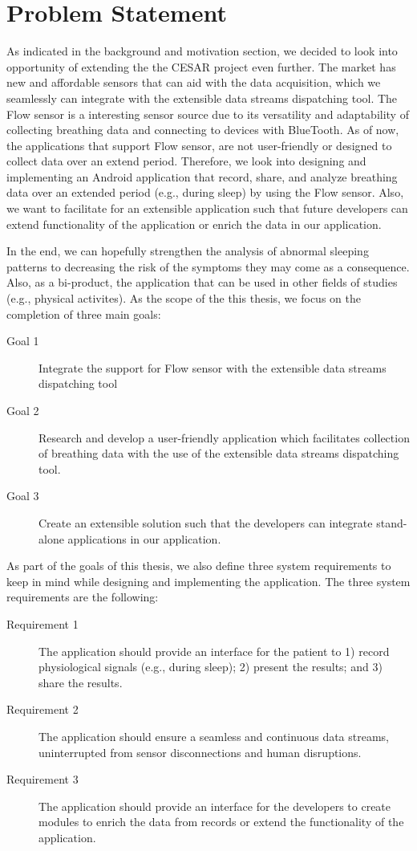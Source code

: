 \section{Problem Statement}

As indicated in the background and motivation section, we decided to look into opportunity of extending the the CESAR project even further. The market has new and affordable sensors that can aid with the data acquisition, which we seamlessly can integrate with the extensible data streams dispatching tool. The Flow sensor is a interesting sensor source due to its versatility and adaptability of collecting breathing data and connecting to devices with BlueTooth. As of now, the applications that support Flow sensor, are not user-friendly or designed to collect data over an extend period. Therefore, we look into designing and implementing an Android application that record, share, and analyze breathing data over an extended period (e.g., during sleep) by using the Flow sensor. Also, we want to facilitate for an extensible application such that future developers can extend functionality of the application or enrich the data in our application. 

In the end, we can hopefully strengthen the analysis of abnormal sleeping patterns to decreasing the risk of the symptoms they may come as a consequence. Also, as a bi-product, the application that can be used in other fields of studies (e.g., physical activites). As the scope of the this thesis, we focus on the completion of three main goals:

\begin{description}
    \item[Goal 1] Integrate the support for Flow sensor with the extensible data streams dispatching tool
    \item[Goal 2] Research and develop a user-friendly application which facilitates collection of breathing data with the use of the extensible data streams dispatching tool.
    \item[Goal 3] Create an extensible solution such that the developers can integrate stand-alone applications in our application. 
\end{description}

As part of the goals of this thesis, we also define three system requirements to keep in mind while designing and implementing the application. The three system requirements are the following: 

\begin{description}
    \item[Requirement 1] The application should provide an interface for the patient to 1) record physiological signals (e.g., during sleep); 2) present the results; and 3) share the results.
    \item[Requirement 2] The application should ensure a seamless and continuous data streams, uninterrupted from sensor disconnections and human disruptions.
    \item[Requirement 3] The application should provide an interface for the developers to create modules to enrich the data from records or extend the functionality of the application.
\end{description}

